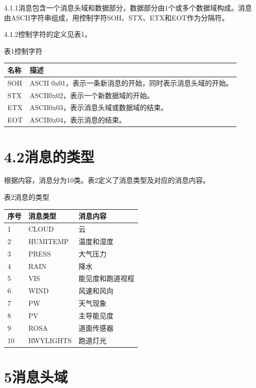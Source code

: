 \documentclass[
  10
]{article}
\begin{document}
4.1.1消息包含一个消息头域和数据部分，数据部分由1个或多个数据域构成。消息由ASCII字符串组成，用控制字符SOH、STX、ETX和EOT作为分隔符。

4.1.2控制字符的定义见表1。

表1控制字符

\begin{longtable}[]{@{}|l|l|@{}}
\toprule\noalign{}
\endhead
\bottomrule\noalign{}
\endlastfoot
\hline
名称 & 描述 \\
\hline
SOH & ASCII 0x01，表示一条新消息的开始，同时表示消息头域的开始。 \\
\hline
STX & ASCII0x02，表示一个新数据域的开始。 \\
\hline
ETX & ASCII0x03，表示消息头域或数据域的结束。 \\
\hline
EOT & ASCII0x04，表示消息的结束。 \\
\hline
\end{longtable}

\section{4.2消息的类型}\label{ux6d88ux606fux7684ux7c7bux578b}

根据内容，消息分为10类。表2定义了消息类型及对应的消息内容。

表2消息的类型

\begin{longtable}[]{@{}|l|l|l|@{}}
\toprule\noalign{}
\endhead
\bottomrule\noalign{}
\endlastfoot
\hline
序号 & 消息类型 & 消息内容 \\
\hline
1 & CLOUD & 云 \\
\hline
2 & HUMITEMP & 温度和湿度 \\
\hline
3 & PRESS & 大气压力 \\
\hline
4 & RAIN & 降水 \\
\hline
5 & VIS & 能见度和跑道视程 \\
\hline
6 & WIND & 风速和风向 \\
\hline
7 & PW & 天气现象 \\
\hline
8 & PV & 主导能见度 \\
\hline
9 & ROSA & 道面传感器 \\
\hline
10 & RWYLIGHTS & 跑道灯光 \\
\hline
\end{longtable}

\section{5消息头域}\label{ux6d88ux606fux5934ux57df}
\end{document}
